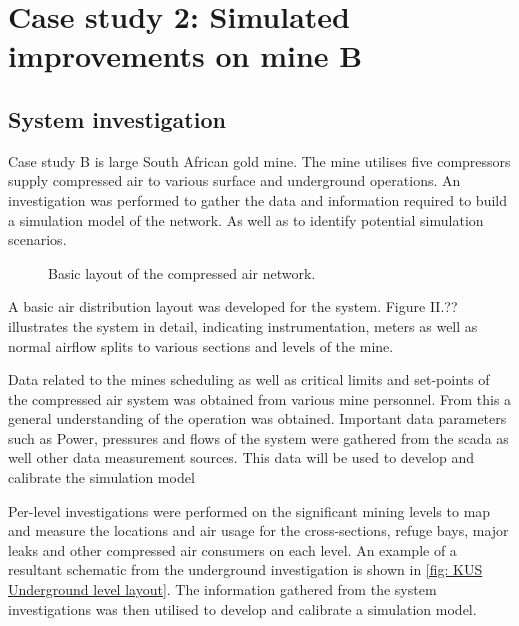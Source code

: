 \section{Case study 2: Simulated improvements on mine B}
	\subsection{System investigation}
	Case study B is large South African gold mine. The mine utilises five compressors supply compressed air to various surface and underground operations. An investigation was performed to gather the data and information required to build a simulation model of the network. As well as to identify potential simulation scenarios.
	\par 
	\begin{figure}[h!]
		\centering
		\caption{Basic layout of the compressed air network.}
		\label{fig: KUS Air layout}
	\end{figure}
A basic air distribution layout was developed for the system.  Figure  II.?? illustrates the system in detail, indicating instrumentation, meters as well as normal airflow splits to various sections and levels of the mine.
\par 
 Data related to the mines scheduling as well as critical limits and set-points of the compressed air system was obtained from various mine personnel.  From this a general understanding of the operation was obtained. Important data parameters such as Power, pressures and flows of the system were gathered from the \gls{scada} as well other data measurement sources. This data will be used to develop and calibrate the simulation model
\par 
		
Per-level investigations were performed on the significant mining levels to map and measure the locations and air usage for the cross-sections, refuge bays, major leaks and other compressed air consumers on each level. An example of a resultant schematic from the underground investigation is shown in \cref{fig: KUS Underground level layout}.  The information gathered from the system investigations was then utilised to develop and calibrate a simulation model.
	
